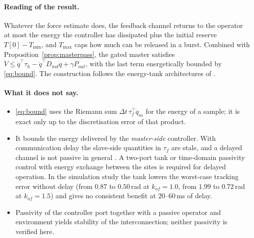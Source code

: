 \documentclass[11pt,a4paper]{article}
\theoremstyle{remark}
\theoremstyle{definition}
\begin{document}
\paragraph{Reading of the result.}
Whatever the force estimate does, the feedback channel returns to the operator at most the energy the controller has dissipated plus the initial reserve $T[0]-T_{\min}$, and $T_{\max}$ caps how much can be
released in a burst. Combined with Proposition~\ref{prop:masterpass}, the gated master satisfies $\dot V\le\dot q^\top\tau_h-\dot q^\top D_{md}\dot q+\gamma P_{out}$, with the last term energetically bounded by
\eqref{eq:bound}. The construction follows the energy-tank architectures of \cite{ferraguti2015,franken2011}.

\paragraph{What it does not say.}
\begin{itemize}[leftmargin=*,itemsep=1pt]
\item \eqref{eq:bound} uses the Riemann sum $\Delta t\,\tau_f^\top\dot q_m$ for the energy of a sample; it is exact only up to the discretisation error of that product.
\item It bounds the energy delivered by the \emph{master-side} controller. With communication delay the slave-side quantities in $\tau_f$ are stale, and a delayed channel is not passive in general
\cite{anderson1989}. A two-port tank or time-domain passivity control with energy exchange between the sites \cite{franken2011,hannaford2002} is required for delayed operation. In the simulation study the tank
lowers the worst-case tracking error without delay (from $0.87$ to $0.50$\,rad at $k_{of}=1.0$, from $1.99$ to $0.72$\,rad at $k_{of}=1.5$) and gives no consistent benefit at $20$--$60$\,ms of delay.
\item Passivity of the controller port together with a passive operator and environment yields stability of the interconnection; neither passivity is verified here.
\end{itemize}

\end{document}
